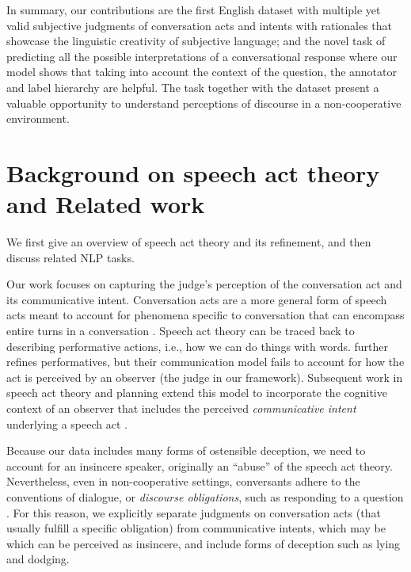 In summary, our contributions are the first English dataset with multiple yet valid subjective judgments of conversation acts and intents with rationales that showcase the linguistic creativity of subjective language; and the novel task of predicting all the possible interpretations of a conversational response where our model shows that taking into account the context of the question, the annotator and label hierarchy are helpful. The task together with the dataset present a valuable opportunity to understand perceptions of discourse in a non-cooperative environment.

\section{Background on speech act theory and Related work}
We first give an overview of speech act theory and its refinement, and then discuss related NLP tasks.

Our work focuses on capturing the judge's perception of the conversation act and its communicative intent. Conversation acts are a more general form of speech acts meant to account for phenomena specific to conversation that can encompass entire turns in a conversation \cite{Traum:1992}. Speech act theory can be traced back to  describing performative actions, i.e., how we can do things with words.  further refines performatives, but 
their communication model fails to account for how the act is perceived by an observer (the judge in our framework). Subsequent work in speech act theory and planning extend this model to incorporate the cognitive context of an observer that includes the perceived \emph{communicative intent} underlying a speech act \cite{Cohen:1979,Pollack:1986}.

Because our data includes many forms of ostensible deception, we need to account for an insincere speaker, originally an ``abuse'' of the speech act theory. Nevertheless, even in non-cooperative settings, conversants adhere to the conventions of dialogue, or \emph{discourse obligations}, such as responding to a question \cite{Traum:1994,Potts:2008}. For this reason, we explicitly separate judgments on conversation acts (that usually fulfill a specific obligation) from communicative intents, which
may be which can be perceived as insincere, and include forms of deception such as lying and dodging.  

